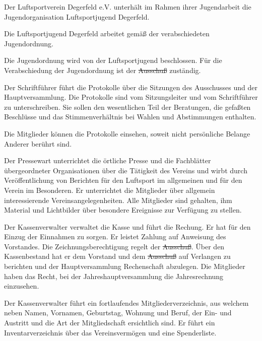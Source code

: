 \documentclass[10pt,a4paper,parskip=half]{scrartcl}
\providecommand{\DIFaddtex}[1]{{\protect\color{blue}\uwave{#1}}} %
\providecommand{\DIFdeltex}[1]{{\protect\color{red}\sout{#1}}}                      %
\providecommand{\DIFaddbegin}{} %
\providecommand{\DIFaddend}{} %
\providecommand{\DIFdelbegin}{} %
\providecommand{\DIFdelend}{} %
\providecommand{\DIFadd}[1]{\texorpdfstring{\DIFaddtex{#1}}{#1}} %
\providecommand{\DIFdel}[1]{\texorpdfstring{\DIFdeltex{#1}}{}} %
\newcommand{\DIFscaledelfig}{0.5}
\newlength{\DIFdelgraphicswidth} %
\newlength{\DIFdelgraphicsheight} %
\newcommand{\DIFaddincludegraphics}[2][]{{\color{blue}\fbox{\DIFOincludegraphics[#1]{#2}}}} %
\newcommand{\DIFdelincludegraphics}[2][]{%
\sbox{\DIFdelgraphicsbox}{\DIFOincludegraphics[#1]{#2}}%
\settoboxwidth{\DIFdelgraphicswidth}{\DIFdelgraphicsbox} %
\settoboxtotalheight{\DIFdelgraphicsheight}{\DIFdelgraphicsbox} %
\scalebox{\DIFscaledelfig}{%
\parbox[b]{\DIFdelgraphicswidth}{\usebox{\DIFdelgraphicsbox}\\[-\baselineskip] \rule{\DIFdelgraphicswidth}{0em}}\llap{\resizebox{\DIFdelgraphicswidth}{\DIFdelgraphicsheight}{%
\setlength{\unitlength}{\DIFdelgraphicswidth}%
\begin{picture}(1,1)%
\thicklines\linethickness{2pt} %
{\color[rgb]{1,0,0}\put(0,0){\framebox(1,1){}}}%
{\color[rgb]{1,0,0}\put(0,0){\line( 1,1){1}}}%
{\color[rgb]{1,0,0}\put(0,1){\line(1,-1){1}}}%
\end{picture}%
}\hspace*{3pt}}} %
} %
\DeclareRobustCommand{\DIFaddbegin}{\DIFOaddbegin \let\includegraphics\DIFaddincludegraphics} %
\DeclareRobustCommand{\DIFaddend}{\DIFOaddend \let\includegraphics\DIFOincludegraphics} %
\DeclareRobustCommand{\DIFdelbegin}{\DIFOdelbegin \let\includegraphics\DIFdelincludegraphics} %
\DeclareRobustCommand{\DIFdelend}{\DIFOaddend \let\includegraphics\DIFOincludegraphics} %
\begin{document}
\begin{contract}
    Der Luftsportverein Degerfeld e.V. unterhält im Rahmen ihrer Jugendarbeit die Jugendorganisation Luftsportjugend Degerfeld.

    Die Luftsportjugend Degerfeld arbeitet gemäß der verabschiedeten Jugendordnung.

    Die Jugendordnung wird von der Luftsportjugend beschlossen. Für die Verabschiedung der Jugendordnung ist der \DIFdelbegin \DIFdel{Ausschuß }\DIFdelend \DIFaddbegin \DIFadd{Ausschuss }\DIFaddend zuständig.

    Der Schriftführer führt die Protokolle über die Sitzungen des Ausschusses und der Hauptversammlung.
    Die Protokolle sind vom Sitzungsleiter und vom Schriftführer zu unterschreiben.
    Sie sollen den wesentlichen Teil der Beratungen,
    die gefaßten Beschlüsse und das Stimmenverhältnis bei Wahlen und Abstimmungen enthalten.

    Die Mitglieder können die Protokolle einsehen,
    soweit nicht persönliche Belange Anderer berührt sind.

    Der Pressewart unterrichtet die örtliche Presse und die Fachblätter übergeordneter Organisationen über die Tätigkeit des Vereins und wirbt durch Veröffentlichung von Berichten für den Luftsport im allgemeinen und für den Verein im Besonderen.
    Er unterrichtet die Mitglieder über allgemein interessierende Vereinsangelegenheiten.
    Alle Mitglieder sind gehalten, ihm Material und Lichtbilder über besondere Ereignisse zur Verfügung zu stellen.

    Der Kassenverwalter verwaltet die Kasse und führt die Rechung.
    Er hat für den Einzug der Einnahmen zu sorgen.
    Er leistet Zahlung auf Anweisung des Vorstandes.
    Die Zeichnungsberechtigung regelt der \DIFdelbegin \DIFdel{Ausschuß}\DIFdelend \DIFaddbegin \DIFadd{Ausschuss}\DIFaddend .
    Über den Kassenbestand hat er dem Vorstand und dem \DIFdelbegin \DIFdel{Ausschuß }\DIFdelend \DIFaddbegin \DIFadd{Ausschuss }\DIFaddend auf Verlangen zu berichten und der Hauptversammlung Rechenschaft abzulegen.
    Die Mitglieder haben das Recht,
    bei der Jahreshauptversammlung die Jahresrechnung einzusehen.

    Der Kassenverwalter führt ein fortlaufendes Mitgliederverzeichnis,
    aus welchem neben Namen,
    Vornamen,
    Geburtstag,
    Wohnung und Beruf,
    der Ein- und Austritt und die Art der Mitgliedschaft ersichtlich sind.
    Er führt ein Inventarverzeichnis über das Vereinsvermögen und eine Spenderliste.


\end{contract}
\end{document}
